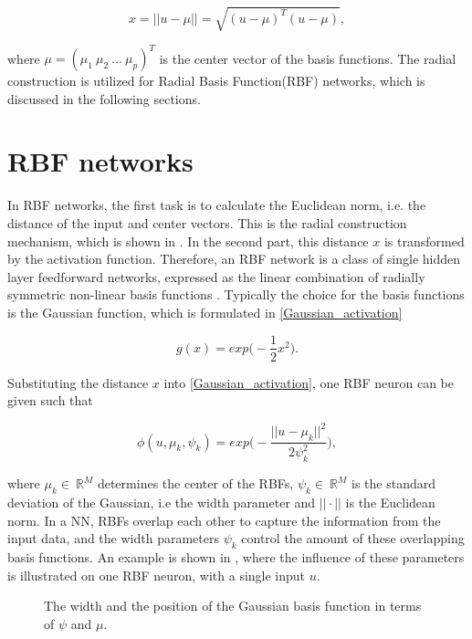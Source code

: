  \begin{equation}
\label{radial_structure}
x = ||u- \mu|| = \sqrt{(u-\mu)^T (u-\mu)},
\end{equation}

where $\mu = (\mu_1 \ \mu_2 \ ... \ \mu_p)^T$ is the center vector of the basis functions. The radial construction is utilized for Radial Basis Function(RBF) networks, which is discussed in the following sections.


\section{RBF networks}
\label{Radial_basis_function_networks}

 In RBF networks, the first task is to calculate the Euclidean norm, i.e. the distance of the input and center vectors. This is the radial construction mechanism, which is shown in . In the second part, this distance $x$ is transformed by the activation function. Therefore, an RBF network is a class of single hidden layer feedforward networks, expressed as the linear combination of radially symmetric non-linear basis functions \cite{RBF_article}. Typically the choice for the basis functions is the Gaussian function, which is formulated in \eqref{Gaussian_activation} 

\begin{equation}
\label{Gaussian_activation}
g(x) = exp \Big(-\frac{1}{2}x^2\Big).
\end{equation}

Substituting the distance $x$ into \eqref{Gaussian_activation}, one RBF neuron can be given such that

 \begin{equation}
\label{Gaussian_activation1}
\phi(u,\mu_k, \psi_k) = exp \Big(-\frac{||u-\mu_k||^2}{2\psi_k^2}\Big), 
\end{equation}

where $\mu_k \in \: \mathbb{R}^{M}$ determines the center of the RBFs, $\psi_k \in \: \mathbb{R}^{M}$ is the standard deviation of the Gaussian, i.e the width parameter and $||\cdot||$ is the Euclidean norm. In a NN, RBFs overlap each other to capture the information from the input data, and the width parameters $\psi_k$ control the amount of these overlapping basis functions. An example is shown in , where the influence of these parameters is illustrated on one RBF neuron, with a single input $u$. 

\begin{figure}[H]
\centering
 
\caption{The width and the position of the Gaussian basis function in terms of $\psi$ and $\mu$.}
\label{fig:rbf_pram}
\end{figure}

